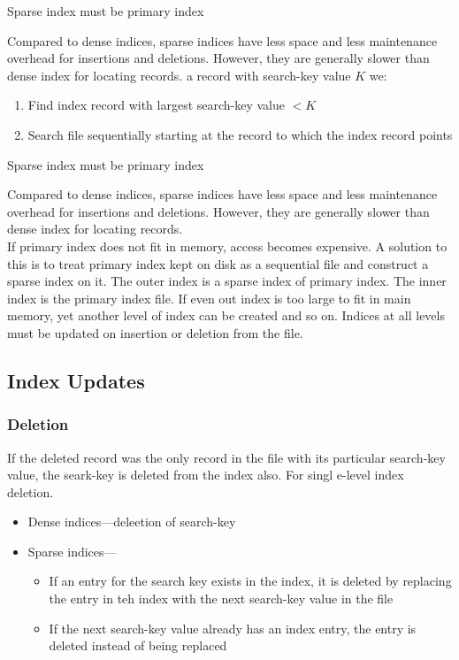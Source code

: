 \documentclass{article}
\begin{document}
\begin{remark}
  Sparse index must be primary index
\end{remark}
Compared to dense indices, sparse indices have less space and less maintenance overhead for insertions and deletions. However, they are generally slower than dense index for locating records. a record with search-key value $K$ we: 
\begin{enumerate}
  \item Find index record with largest search-key value $<K$ 
  \item Search file sequentially starting at the record to which the index record points
\end{enumerate}

\begin{remark}
  Sparse index must be primary index
\end{remark}
Compared to dense indices, sparse indices have less space and less maintenance overhead for insertions and deletions. However, they are generally slower than dense index for locating records. \\ 

If primary index does not fit in memory, access becomes expensive. A solution to this is to treat primary index kept on disk as a sequential file and construct a sparse index on it. The outer index is a sparse index of primary index. The inner index is the primary index file. If even out index is too large to fit in main memory, yet another level of index can be created and so on. Indices at all levels must be updated on insertion or deletion from the file. 

\subsection{Index Updates}

\subsubsection{Deletion} 

If the deleted record was the only record in the file with its particular search-key value, the seark-key is deleted from the index also. For singl e-level index deletion. 
\begin{itemize}
  \item Dense indices---deleetion of search-key 
  \item Sparse indices--- 
    \begin{itemize}
      \item If an entry for the search key exists in the index, it is deleted by replacing the entry in teh index with the next search-key value in the file 
      \item If the next search-key value already has an index entry, the entry is deleted instead of being replaced
    \end{itemize}
\end{itemize}
\end{document}
